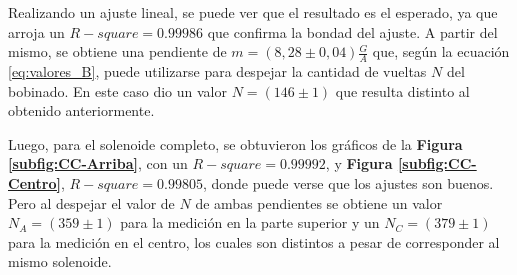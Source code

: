 \documentclass[11pt,a4paper]{article}
\begin{document}
Realizando un ajuste lineal, se puede ver que el resultado es el esperado, ya que arroja un $R-square= 0.99986$ que confirma la bondad del ajuste. A partir del mismo, se obtiene una pendiente de $m = (8,28 \pm 0,04)\frac{G}{A}$ que, según la ecuación \eqref{eq:valores_B}, puede utilizarse para despejar la cantidad de vueltas $N$ del bobinado. En este caso dio un valor $N= (146 \pm 1)$ que resulta distinto al obtenido anteriormente.

Luego, para el solenoide completo, se obtuvieron los gráficos de la \textbf{Figura \ref{subfig:CC-Arriba}}, con un $R-square= 0.99992$, y \textbf{Figura \ref{subfig:CC-Centro}}, $R-square= 0.99805$,  donde puede verse que los ajustes son buenos. Pero al despejar el valor de $N$ de ambas pendientes se obtiene un valor $N_{A} = (359 \pm 1)$ para la medición en la parte superior y un $N_{C}=(379 \pm 1)$ para la medición en el centro, los cuales son distintos a pesar de corresponder al mismo solenoide.
\end{document}
